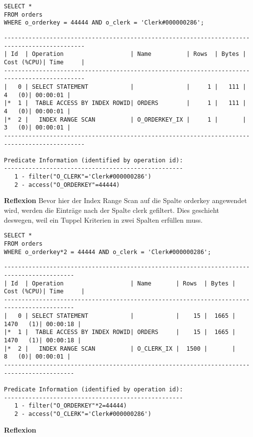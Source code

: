 \documentclass[10pt]{article}
\begin{document}
\begin{lstlisting}[style=sql]
SELECT *
FROM orders
WHERE o_orderkey = 44444 AND o_clerk = 'Clerk#000000286';
\end{lstlisting}
\begin{lstlisting}[style=queryexecutionplan]
---------------------------------------------------------------------------------------------
| Id  | Operation                   | Name          | Rows  | Bytes | Cost (%CPU)| Time     |
---------------------------------------------------------------------------------------------
|   0 | SELECT STATEMENT            |               |     1 |   111 |     4   (0)| 00:00:01 |
|*  1 |  TABLE ACCESS BY INDEX ROWID| ORDERS        |     1 |   111 |     4   (0)| 00:00:01 |
|*  2 |   INDEX RANGE SCAN          | O_ORDERKEY_IX |     1 |       |     3   (0)| 00:00:01 |
---------------------------------------------------------------------------------------------

Predicate Information (identified by operation id):
---------------------------------------------------
   1 - filter("O_CLERK"='Clerk#000000286')
   2 - access("O_ORDERKEY"=44444)
\end{lstlisting}
\textbf{Reflexion} \newline
Bevor hier der Index Range Scan auf die Spalte orderkey angewendet wird, werden die Einträge nach der Spalte clerk gefiltert. Dies geschieht deswegen, weil ein Tuppel Kriterien in zwei Spalten erfüllen muss.

\begin{lstlisting}[style=sql]
SELECT *
FROM orders
WHERE o_orderkey*2 = 44444 AND o_clerk = 'Clerk#000000286';
\end{lstlisting}
\begin{lstlisting}[style=queryexecutionplan]
------------------------------------------------------------------------------------------
| Id  | Operation                   | Name       | Rows  | Bytes | Cost (%CPU)| Time     |
------------------------------------------------------------------------------------------
|   0 | SELECT STATEMENT            |            |    15 |  1665 |  1470   (1)| 00:00:18 |
|*  1 |  TABLE ACCESS BY INDEX ROWID| ORDERS     |    15 |  1665 |  1470   (1)| 00:00:18 |
|*  2 |   INDEX RANGE SCAN          | O_CLERK_IX |  1500 |       |     8   (0)| 00:00:01 |
------------------------------------------------------------------------------------------

Predicate Information (identified by operation id):
---------------------------------------------------
   1 - filter("O_ORDERKEY"*2=44444)
   2 - access("O_CLERK"='Clerk#000000286')
\end{lstlisting}
\textbf{Reflexion} \newline
\end{document}
